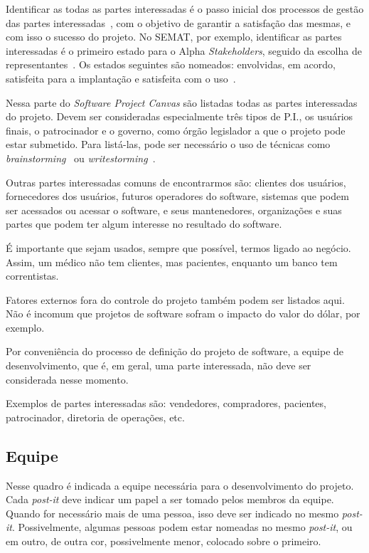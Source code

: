 \documentclass[a4]{report}
\begin{document}
Identificar as todas as partes interessadas é o passo inicial dos processos de gestão das partes interessadas~\citep{jacobson_essentials_2019,pmbok:6}, com o objetivo de garantir a satisfação das mesmas, e com isso o sucesso do projeto. No SEMAT, por exemplo, identificar as partes interessadas é o primeiro estado para o Alpha \textit{Stakeholders}, seguido da escolha de representantes~\citep{jacobson_essentials_2019}.  Os estados seguintes são nomeados: envolvidas, em acordo, satisfeita para a implantação e satisfeita com o uso~\citep{jacobson_essentials_2019}.

Nessa parte do \textit{Software Project Canvas} são listadas todas as partes interessadas  do projeto. Devem ser consideradas especialmente três tipos de P.I., os usuários finais, o patrocinador e o governo, como órgão legislador a que o projeto pode estar submetido. Para listá-las, pode ser necessário o uso de técnicas como \textit{brainstorming}~\citep{tracy:2015} ou \textit{writestorming}~\citep{gray:2010}.

Outras partes interessadas comuns de encontrarmos são: clientes dos usuários, fornecedores dos usuários, futuros operadores do software, sistemas que podem ser acessados ou acessar o software, e seus mantenedores, organizações e suas partes que podem ter algum interesse no resultado do software.

É importante que sejam usados, sempre que possível, termos ligado ao negócio. Assim, um médico não tem clientes, mas pacientes, enquanto um banco tem correntistas.

Fatores externos fora do controle do projeto também podem ser listados aqui. Não é incomum que projetos de software sofram o impacto do valor do dólar, por exemplo.

Por conveniência do processo de definição do projeto de software, a equipe de desenvolvimento, que é, em geral, uma parte interessada, não deve ser considerada nesse momento.

Exemplos de partes interessadas são: vendedores, compradores, pacientes, patrocinador, diretoria de operações, etc.

\subsection{Equipe}

Nesse quadro é indicada a equipe necessária para o desenvolvimento do projeto. Cada \textit{post-it} deve indicar um papel a ser tomado pelos membros da equipe. Quando for necessário mais de uma pessoa, isso deve ser indicado no mesmo \textit{post-it}. Possivelmente, algumas pessoas podem estar nomeadas no mesmo \textit{post-it}, ou em outro, de outra cor, possivelmente menor, colocado sobre o primeiro.
\end{document}
